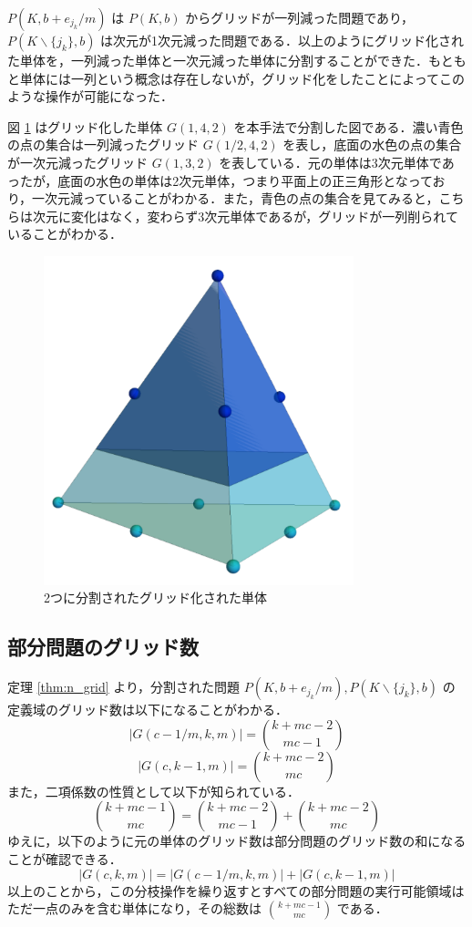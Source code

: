 \documentclass[a4paper,11pt]{jreport}
\begin{document}
$ P(K, b + e_{j_k} / m) $ は $ P(K, b) $ からグリッドが一列減った問題であり，$ P(K \backslash \{ j_k \}, b) $ は次元が1次元減った問題である．以上のようにグリッド化された単体を，一列減った単体と一次元減った単体に分割することができた．もともと単体には一列という概念は存在しないが，グリッド化をしたことによってこのような操作が可能になった．\par
図 \ref{fig:divided_simplices} はグリッド化した単体 $ G(1, 4, 2) $ を本手法で分割した図である．濃い青色の点の集合は一列減ったグリッド $ G(1/2, 4, 2) $ を表し，底面の水色の点の集合が一次元減ったグリッド $ G(1, 3, 2) $ を表している．元の単体は3次元単体であったが，底面の水色の単体は2次元単体，つまり平面上の正三角形となっており，一次元減っていることがわかる．また，青色の点の集合を見てみると，こちらは次元に変化はなく，変わらず3次元単体であるが，グリッドが一列削られていることがわかる．

\begin{figure}
\begin{center}
\includegraphics[width=9cm]{graphs/divided_simplices.pdf}
\caption{2つに分割されたグリッド化された単体}
\label{fig:divided_simplices}
\end{center}
\end{figure}

\subsection{部分問題のグリッド数}

定理 \ref{thm:n_grid} より，分割された問題 $ P(K, b + e_{j_k} / m), P(K \backslash \{ j_k \}, b) $ の定義域のグリッド数は以下になることがわかる．
$$ | G(c - 1/m, k, m) | = \binom{k + mc - 2}{mc - 1} $$
$$ | G(c, k - 1, m) | = \binom{k + mc - 2}{mc} $$
また，二項係数の性質として以下が知られている．
$$ \binom{k + mc - 1}{mc} = \binom{k + mc - 2}{mc - 1} + \binom{k + mc - 2}{mc} $$
ゆえに，以下のように元の単体のグリッド数は部分問題のグリッド数の和になることが確認できる．
$$ | G(c, k, m) | = | G(c - 1/m, k, m) | + | G(c, k - 1, m) | $$
以上のことから，この分枝操作を繰り返すとすべての部分問題の実行可能領域はただ一点のみを含む単体になり，その総数は $ \binom{k + mc - 1}{mc} $ である．\par
\end{document}
